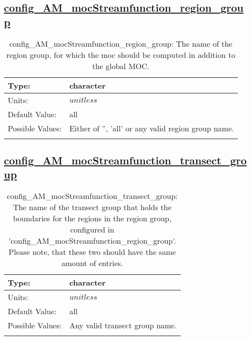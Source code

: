 \subsection[config\_AM\_mocStreamfunction\_region\_group]{\hyperref[sec:nm_tab_AM_mocStreamfunction]{config\_AM\_mocStreamfunction\_region\_group}}
\label{subsec:nm_sec_config_AM_mocStreamfunction_region_group}
\begin{center}
\begin{longtable}{| p{2.0in} || p{4.0in} |}
    \hline
    Type: & character \\
    \hline
    Units: & $unitless$ \\
    \hline
    Default Value: & all \\
    \hline
    Possible Values: & Either of '', 'all' or any valid region group name. \\
    \hline
    \caption{config\_AM\_mocStreamfunction\_region\_group: The name of the region group, for which the moc should be computed in addition to the global MOC.}
\end{longtable}
\end{center}
\subsection[config\_AM\_mocStreamfunction\_transect\_group]{\hyperref[sec:nm_tab_AM_mocStreamfunction]{config\_AM\_mocStreamfunction\_transect\_group}}
\label{subsec:nm_sec_config_AM_mocStreamfunction_transect_group}
\begin{center}
\begin{longtable}{| p{2.0in} || p{4.0in} |}
    \hline
    Type: & character \\
    \hline
    Units: & $unitless$ \\
    \hline
    Default Value: & all \\
    \hline
    Possible Values: & Any valid transect group name. \\
    \hline
    \caption{config\_AM\_mocStreamfunction\_transect\_group: The name of the transect group that holds the boundaries for the regions in the region group, configured in 'config\_AM\_mocStreamfunction\_region\_group'. Please note, that these two should have the same amount of entries.}
\end{longtable}
\end{center}
